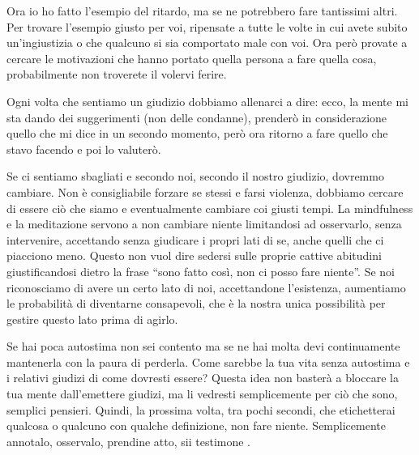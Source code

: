 \documentclass[12pt]{book} %
\begin{document}
Ora io ho fatto l'esempio del ritardo, ma se ne potrebbero fare tantissimi altri. Per trovare
l'esempio giusto per voi, ripensate a tutte le volte in cui avete subito un'ingiustizia o
che qualcuno si sia comportato male con voi. Ora però provate a
cercare le motivazioni che hanno portato quella persona a fare quella cosa, probabilmente non troverete il volervi
ferire.

Ogni volta che sentiamo un giudizio dobbiamo allenarci a dire: ecco, la mente mi sta
dando dei suggerimenti (non delle condanne), prenderò in considerazione quello che mi dice in un
secondo momento, però ora ritorno a fare quello che stavo facendo e
poi lo valuterò.

Se ci sentiamo
sbagliati e secondo noi, secondo il nostro giudizio, dovremmo cambiare. Non è consigliabile forzare se stessi e farsi
violenza, dobbiamo cercare di essere ciò che siamo e eventualmente cambiare coi giusti tempi. La mindfulness e la
meditazione servono a non cambiare niente limitandosi ad osservarlo, senza intervenire, accettando senza giudicare i
propri lati di se, anche quelli che ci piacciono meno. Questo non vuol dire sedersi sulle proprie cattive abitudini
giustificandosi dietro la frase “sono fatto così, non ci posso fare niente”. Se noi riconosciamo di avere un certo lato
di noi, accettandone l'esistenza, aumentiamo le probabilità di diventarne consapevoli, che è la nostra unica possibilità per gestire questo lato prima di agirlo.

Se hai poca autostima non sei contento ma se ne hai molta devi continuamente mantenerla con la paura di perderla. Come
sarebbe la tua vita senza autostima e i relativi giudizi di come dovresti essere? Questa idea non basterà a bloccare la
tua mente dall'emettere giudizi, ma li vedresti semplicemente per ciò che sono, semplici pensieri.
Quindi, la prossima volta, tra pochi secondi, che etichetterai qualcosa o qualcuno con qualche definizione, non fare
niente. Semplicemente annotalo, osservalo, prendine atto, sii
testimone
.
\end{document}
